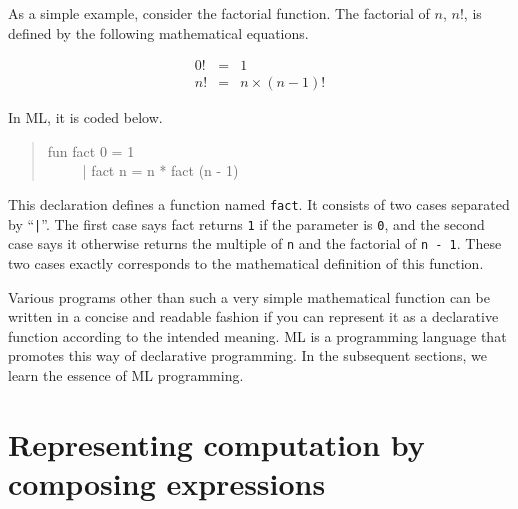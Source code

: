 \documentclass{jbook}
\newcommand{\txt}[2]{#2}
\begin{document}
\txt
{
	簡単な例として，数学の教科書で学んだ階乗を計算するプログラムを考
えてみましょう．
	自然数$n$の階乗$n !$は，以下のように定義されます．
}
{
	As a simple example, consider the factorial function.
	The factorial of $n$,  $n !$, is defined by the following mathematical
equations.
}
\begin{eqnarray*}
0 ! &=& 1
\\
n ! &=& n \times (n - 1) !
\end{eqnarray*}
\txt
{
MLでは，このプログラムを以下のように記述できます．
}
{
In ML, it is coded below.
}
\begin{tt}
\begin{quote}
fun fact 0 = 1\\
\ \ \ \ \ | fact n = n * fact (n - 1)
\end{quote}
\end{tt}
\txt
{
	この宣言によって{\tt fact}と言う名前の関数が定義されます．
	この定義は``{\tt |}''によって区切られた２つの場合からなっています．
	上段は，引数が{\tt 0}の場合は{\tt 1}を返すことを表し，下段はそれ
以外の場合，引数{\tt n}と{\tt n - 1}の階乗とを掛けた結果を返すことを表し
ています．
	それぞれが，上記の階乗の定義とほぼ完全に一致していることがおわかりでしょう．
}
{
	This declaration defines a function named {\tt fact}.
	It consists of two cases separated by ``{\tt |}''.
	The first case says fact returns {\tt 1} if the parameter is
{\tt 0}, and the second case says it otherwise returns the multiple of
{\tt n} and the factorial of {\tt n - 1}.
	These two cases exactly corresponds to the mathematical
definition of this function.
}
	
\txt
{
	このような単純な関数に限らず，種々のプログラムを，その意図する意
味に従い宣言的な関数として表現できれば，複雑なプログラムをより簡潔かつ分
かりやすく書き下すことができるかもしれません．
	プログラミング言語MLは，この考え方に従い，大規模で複雑な計算をプ
ログラムする言語と言えます．
	以下に続く節で，その基本となる考え方を学んでいきましょう．
}
{
	Various programs other than such a very simple mathematical
function can be written in a concise and readable fashion if you
can represent it as a declarative function according to the intended
meaning.
	ML is a programming language that promotes this way of declarative
programming.
	In the subsequent sections, we learn the essence of ML
programming.
}
\section{
\txt{式の組み合わせによる計算の表現}
{Representing computation by composing expressions}
}
\label{sec:tutorialExpression}
\end{document}
